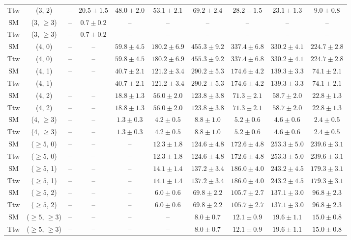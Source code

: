\begin{table}[h!]
{\begin{tabular}{cccccccccc}
	Ttw & (3, 2) & -- & $20.5\pm 1.5$ & $48.0\pm 2.0$ & $53.1\pm 2.1$ & $69.2\pm 2.4$ & $28.2\pm 1.5$ & $23.1\pm 1.3$ & $9.0\pm 0.8$ \\[0.5ex] 
	SM & (3, $\ge3$) & -- & $0.7\pm 0.2$ & -- & -- & -- & -- & -- & -- \\[0.5ex] 
	Ttw & (3, $\ge3$) & -- & $0.7\pm 0.2$ & -- & -- & -- & -- & -- & -- \\[0.5ex] 
	SM & (4, 0) & -- & -- & $59.8\pm 4.5$ & $180.2\pm 6.9$ & $455.3\pm 9.2$ & $337.4\pm 6.8$ & $330.2\pm 4.1$ & $224.7\pm 2.8$ \\[0.5ex] 
	Ttw & (4, 0) & -- & -- & $59.8\pm 4.5$ & $180.2\pm 6.9$ & $455.3\pm 9.2$ & $337.4\pm 6.8$ & $330.2\pm 4.1$ & $224.7\pm 2.8$ \\[0.5ex] 
	SM & (4, 1) & -- & -- & $40.7\pm 2.1$ & $121.2\pm 3.4$ & $290.2\pm 5.3$ & $174.6\pm 4.2$ & $139.3\pm 3.3$ & $74.1\pm 2.1$ \\[0.5ex] 
	Ttw & (4, 1) & -- & -- & $40.7\pm 2.1$ & $121.2\pm 3.4$ & $290.2\pm 5.3$ & $174.6\pm 4.2$ & $139.3\pm 3.3$ & $74.1\pm 2.1$ \\[0.5ex] 
	SM & (4, 2) & -- & -- & $18.8\pm 1.3$ & $56.0\pm 2.0$ & $123.8\pm 3.8$ & $71.3\pm 2.1$ & $58.7\pm 2.0$ & $22.8\pm 1.3$ \\[0.5ex] 
	Ttw & (4, 2) & -- & -- & $18.8\pm 1.3$ & $56.0\pm 2.0$ & $123.8\pm 3.8$ & $71.3\pm 2.1$ & $58.7\pm 2.0$ & $22.8\pm 1.3$ \\[0.5ex] 
	SM & (4, $\ge3$) & -- & -- & $1.3\pm 0.3$ & $4.2\pm 0.5$ & $8.8\pm 1.0$ & $5.2\pm 0.6$ & $4.6\pm 0.6$ & $2.4\pm 0.5$ \\[0.5ex] 
	Ttw & (4, $\ge3$) & -- & -- & $1.3\pm 0.3$ & $4.2\pm 0.5$ & $8.8\pm 1.0$ & $5.2\pm 0.6$ & $4.6\pm 0.6$ & $2.4\pm 0.5$ \\[0.5ex] 
	SM & ($\ge5$, 0) & -- & -- & -- & $12.3\pm 1.8$ & $124.6\pm 4.8$ & $172.6\pm 4.8$ & $253.3\pm 5.0$ & $239.6\pm 3.1$ \\[0.5ex] 
	Ttw & ($\ge5$, 0) & -- & -- & -- & $12.3\pm 1.8$ & $124.6\pm 4.8$ & $172.6\pm 4.8$ & $253.3\pm 5.0$ & $239.6\pm 3.1$ \\[0.5ex] 
	SM & ($\ge5$, 1) & -- & -- & -- & $14.1\pm 1.4$ & $137.2\pm 3.4$ & $186.0\pm 4.0$ & $243.2\pm 4.5$ & $179.3\pm 3.1$ \\[0.5ex] 
	Ttw & ($\ge5$, 1) & -- & -- & -- & $14.1\pm 1.4$ & $137.2\pm 3.4$ & $186.0\pm 4.0$ & $243.2\pm 4.5$ & $179.3\pm 3.1$ \\[0.5ex] 
	SM & ($\ge5$, 2) & -- & -- & -- & $6.0\pm 0.6$ & $69.8\pm 2.2$ & $105.7\pm 2.7$ & $137.1\pm 3.0$ & $96.8\pm 2.3$ \\[0.5ex] 
	Ttw & ($\ge5$, 2) & -- & -- & -- & $6.0\pm 0.6$ & $69.8\pm 2.2$ & $105.7\pm 2.7$ & $137.1\pm 3.0$ & $96.8\pm 2.3$ \\[0.5ex] 
	SM & ($\ge5$, $\ge3$) & -- & -- & -- & -- & $8.0\pm 0.7$ & $12.1\pm 0.9$ & $19.6\pm 1.1$ & $15.0\pm 0.8$ \\[0.5ex] 
	Ttw & ($\ge5$, $\ge3$) & -- & -- & -- & -- & $8.0\pm 0.7$ & $12.1\pm 0.9$ & $19.6\pm 1.1$ & $15.0\pm 0.8$ \\[0.5ex] 
	\hline
	\hline
\end{tabular}}
\end{table}
